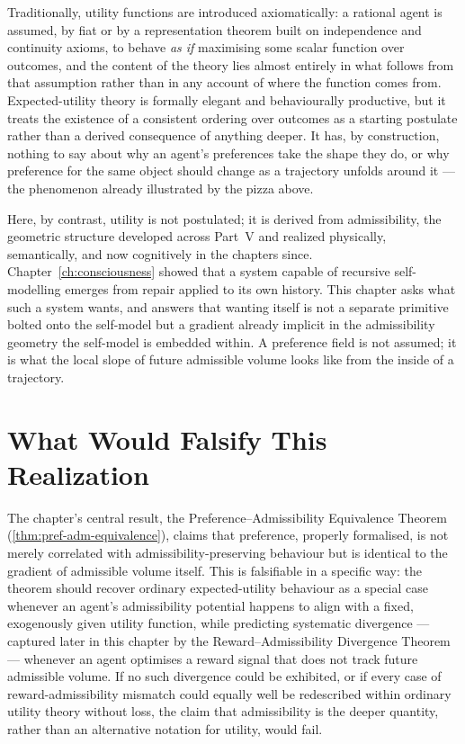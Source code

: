 \documentclass[12pt,twoside,openright]{book}
\begin{document}
Traditionally, utility functions are introduced
axiomatically: a rational agent is assumed, by fiat or by a
representation theorem built on independence and continuity
axioms, to behave \emph{as if} maximising some scalar
function over outcomes, and the content of the theory lies
almost entirely in what follows from that assumption rather
than in any account of where the function comes from.
Expected-utility theory is formally elegant and behaviourally
productive, but it treats the existence of a consistent
ordering over outcomes as a starting postulate rather than a
derived consequence of anything deeper. It has, by
construction, nothing to say about why an agent's preferences
take the shape they do, or why preference for the same object
should change as a trajectory unfolds around it --- the
phenomenon already illustrated by the pizza above.

Here, by contrast, utility is not postulated; it is derived
from admissibility, the geometric structure developed across
Part~V and realized physically, semantically, and now
cognitively in the chapters since. Chapter~\ref{ch:consciousness}
showed that a system capable of recursive self-modelling
emerges from repair applied to its own history. This chapter
asks what such a system wants, and answers that wanting itself
is not a separate primitive bolted onto the self-model but a
gradient already implicit in the admissibility geometry the
self-model is embedded within. A preference field is not
assumed; it is what the local slope of future admissible
volume looks like from the inside of a trajectory.

\section{What Would Falsify This Realization}
\label{sec:ch22-falsifiability}

The chapter's central result, the Preference--Admissibility
Equivalence Theorem (\cref{thm:pref-adm-equivalence}), claims
that preference, properly formalised, is not merely
correlated with admissibility-preserving behaviour but is
identical to the gradient of admissible volume itself. This
is falsifiable in a specific way: the theorem should recover
ordinary expected-utility behaviour as a special case
whenever an agent's admissibility potential happens to align
with a fixed, exogenously given utility function, while
predicting systematic divergence --- captured later in this
chapter by the Reward--Admissibility Divergence Theorem ---
whenever an agent optimises a reward signal that does not
track future admissible volume. If no such divergence could
be exhibited, or if every case of reward-admissibility
mismatch could equally well be redescribed within ordinary
utility theory without loss, the claim that admissibility is
the deeper quantity, rather than an alternative notation for
utility, would fail.
\end{document}
